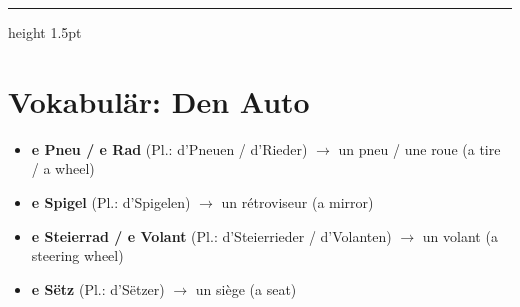 \vspace{1.5cm}
\color{geminiBlue}\hrule height 1.5pt \vspace{0.5em}\color{black}
\section{Vokabulär: Den Auto}

\begin{itemize}
    \item \textbf{e Pneu / e Rad} (Pl.: d'Pneuen / d'Rieder) $\rightarrow$ un pneu / une roue (a tire / a wheel)
    \item \textbf{e Spigel} (Pl.: d'Spigelen) $\rightarrow$ un rétroviseur (a mirror)
    \item \textbf{e Steierrad / e Volant} (Pl.: d'Steierrieder / d'Volanten) $\rightarrow$ un volant (a steering wheel)
    \item \textbf{e Sëtz} (Pl.: d'Sëtzer) $\rightarrow$ un siège (a seat)
\end{itemize}

\vspace{1em}

